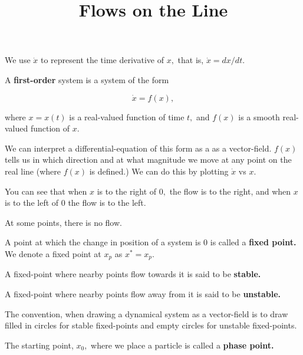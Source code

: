 \documentclass{article}
\title{Flows on the Line}
\begin{document}
We use $\dot{x}$ to represent the time derivative of $x,$ that is, $\dot{x} = dx/dt.$

\begin{definition}
A \textbf{first-order} system is a system of the form

\[ \dot{x} = f(x), \]

where $x = x(t)$ is a \@{real-valued} \@{function} of time $t,$ and $f(x)$ is a \@{smooth} real-valued function of $x.$
\end{definition}

We can interpret a \@{differential-equation} of this form as a as a \@{vector-field}. $f(x)$ tells us in which direction and at what magnitude we move at any point on the real line (where $f(x)$ is defined.) We can do this by plotting $\dot{x}$ vs $x.$


You can see that when $x$ is to the right of $0,$ the flow is to the right, and when $x$ is to the left of 0 the flow is to the left.

At some points, there is no flow.

\begin{definition}
A point at which the change in position of a system is $0$ is called a \textbf{fixed point.} We denote a fixed point at $x_p$ as $x^* = x_p.$
\end{definition}

\begin{definition}[Stable]
A \@{fixed-point} where nearby points flow towards it is said to be \textbf{stable.}
\end{definition}

\begin{definition}[Unstable]
A \@{fixed-point} where nearby points flow away from it is said to be \textbf{unstable.}
\end{definition}

\begin{remark}
The convention, when drawing a dynamical system as a \@{vector-field} is to draw filled in circles for \@{stable} \@{fixed-points} and empty circles for \@{unstable} \@{fixed-points}.
\end{remark}

\begin{definition}
The starting point, $x_0,$ where we place a particle is called a \textbf{phase point.}
\end{definition}
\end{document}
